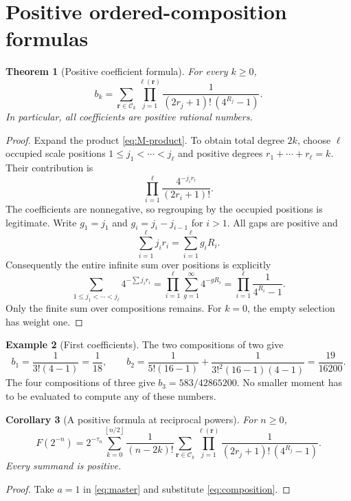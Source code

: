 \documentclass[11pt,a4paper]{article}
\newtheorem{theorem}{Theorem}[section]
\newtheorem{corollary}[theorem]{Corollary}
\theoremstyle{definition}
\newtheorem{example}[theorem]{Example}
\theoremstyle{remark}
\newcommand{\Comp}{\mathcal C}
\newcommand{\floor}[1]{\left\lfloor #1\right\rfloor}
\begin{document}
\section{Positive ordered-composition formulas}
\label{sec:composition}
\begin{theorem}[Positive coefficient formula]
\label{thm:composition}
For every \(k\geq0\),
\begin{equation}
 \boxed{\displaystyle
 b_k=\sum_{\mathbf r\in\Comp_k}
       \prod_{j=1}^{\ell(\mathbf r)}
       \frac{1}{(2r_j+1)!\,(4^{R_j}-1)}.}                 \label{eq:composition}
\end{equation}
In particular, all coefficients are positive rational numbers.
\end{theorem}
\begin{proof}
Expand the product \eqref{eq:M-product}.  To obtain total degree \(2k\), choose
\(\ell\) occupied scale positions
\(1\leq j_1<\cdots<j_\ell\) and positive degrees
\(r_1+\cdots+r_\ell=k\).  Their contribution is
\[
 \prod_{i=1}^{\ell}\frac{4^{-j_i r_i}}{(2r_i+1)!}.
\]
The coefficients are nonnegative, so regrouping by the occupied positions is
legitimate.  Write \(g_1=j_1\) and \(g_i=j_i-j_{i-1}\) for \(i>1\).  All gaps
are positive and
\[
 \sum_{i=1}^{\ell}j_i r_i=\sum_{i=1}^{\ell}g_i R_i.
\]
Consequently the entire infinite sum over positions is explicitly
\[
 \sum_{1\leq j_1<\cdots<j_\ell}4^{-\sum j_i r_i}
 =\prod_{i=1}^{\ell}\sum_{g=1}^{\infty}4^{-gR_i}
 =\prod_{i=1}^{\ell}\frac1{4^{R_i}-1}.
\]
Only the finite sum over compositions remains.  For \(k=0\), the empty selection
has weight one.
\end{proof}

\begin{example}[First coefficients]
The two compositions of two give
\[
 b_1=\frac1{3!(4-1)}=\frac1{18},\qquad
 b_2=\frac1{5!(16-1)}+
       \frac1{3!^2(16-1)(4-1)}=\frac{19}{16200}.
\]
The four compositions of three give \(b_3=583/42865200\).
No smaller moment has to be evaluated to compute any of these numbers.
\end{example}

\begin{corollary}[A positive formula at reciprocal powers]
For \(n\geq0\),
\begin{equation}
 F(2^{-n})=2^{-\tau_n}
 \sum_{k=0}^{\floor{n/2}}\frac1{(n-2k)!}
 \sum_{\mathbf r\in\Comp_k}
 \prod_{j=1}^{\ell(\mathbf r)}
 \frac1{(2r_j+1)!\,(4^{R_j}-1)}.                          \label{eq:inverse-power-positive}
\end{equation}
Every summand is positive.
\end{corollary}
\begin{proof}
Take \(a=1\) in \eqref{eq:master} and substitute \eqref{eq:composition}.
\end{proof}
\end{document}

